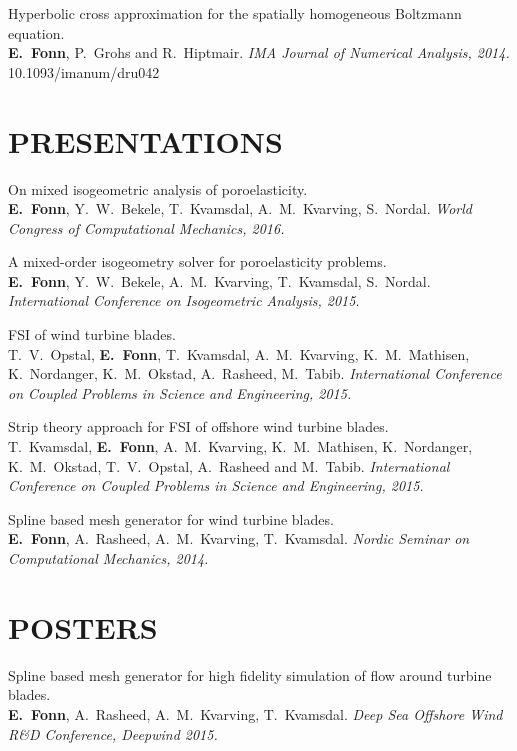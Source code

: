 \documentclass[line,margin]{res}
\begin{document}
\begin{resume}
\newpage

Hyperbolic cross approximation for the spatially homogeneous Boltzmann equation. \\
{\bf E.~Fonn}, P.~Grohs and R.~Hiptmair.
{\em IMA Journal of Numerical Analysis, 2014.} \\
10.1093/imanum/dru042

\section{PRESENTATIONS}

On mixed isogeometric analysis of poroelasticity. \\
{\bf E.~Fonn}, Y.~W.~Bekele, T.~Kvamsdal, A.~M.~Kvarving, S.~Nordal.
{\em {} World Congress of Computational Mechanics, 2016.}

A mixed-order isogeometry solver for poroelasticity problems. \\
{\bf E.~Fonn}, Y.~W.~Bekele, A.~M.~Kvarving, T.~Kvamsdal, S.~Nordal.
{\em {} International Conference on Isogeometric Analysis, 2015.}

FSI of wind turbine blades. \\
T.~V.~Opstal, {\bf E.~Fonn}, T.~Kvamsdal, A.~M.~Kvarving, K.~M.~Mathisen,
K.~Nordanger, K.~M.~Okstad, A.~Rasheed, M.~Tabib.
{\em {} International Conference on Coupled Problems in Science and Engineering, 2015.}

Strip theory approach for FSI of offshore wind turbine blades. \\
T.~Kvamsdal, {\bf E.~Fonn}, A.~M.~Kvarving, K.~M.~Mathisen, K.~Nordanger,
K.~M.~Okstad, T.~V.~Opstal, A.~Rasheed and M.~Tabib.
{\em {} International Conference on Coupled Problems in Science and Engineering, 2015.}

Spline based mesh generator for wind turbine blades. \\
{\bf E.~Fonn}, A.~Rasheed, A.~M.~Kvarving, T.~Kvamsdal.
{\em {} Nordic Seminar on Computational Mechanics, 2014.}

\section{POSTERS}

Spline based mesh generator for high fidelity simulation of flow around turbine blades. \\
{\bf E.~Fonn}, A.~Rasheed, A.~M.~Kvarving, T.~Kvamsdal.
{\em {} Deep Sea Offshore Wind R\&D Conference, Deepwind 2015.}


\end{resume}
\end{document}
